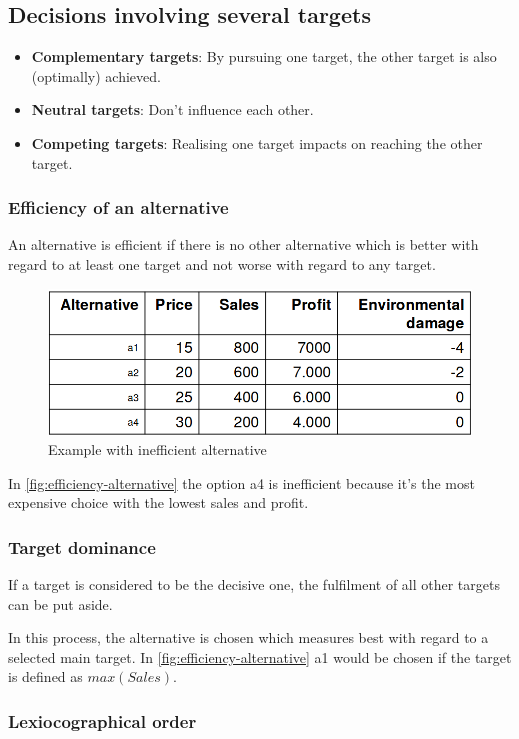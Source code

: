 \subsection{Decisions involving several targets}

\begin{itemize}
\tightlist
\item
  \textbf{Complementary targets}: By pursuing one target, the other
  target is also (optimally) achieved.
\item
  \textbf{Neutral targets}: Don't influence each other.
\item
  \textbf{Competing targets}: Realising one target impacts on reaching
  the other target.
\end{itemize}

\subsubsection{Efficiency of an alternative}
An alternative is efficient if there is no other alternative which is better
with regard to at least one target and not worse with regard to any target.
\begin{figure}[H]
	\centering
	\includegraphics[width=.6\textwidth]{figures/efficiency-alternative.png}
	\caption{Example with inefficient alternative}
	\label{fig:efficiency-alternative}
\end{figure}

In \autoref{fig:efficiency-alternative} the option a4 is inefficient because
it's the most expensive choice with the lowest sales and profit.

\subsubsection{Target dominance}
If a target is considered to be the decisive one, the fulfilment of all other
targets can be put aside.

In this process, the alternative is chosen which measures best with regard
to a selected main target. In \autoref{fig:efficiency-alternative} a1 would
be chosen if the target is defined as $max(Sales)$.

\subsubsection{Lexiocographical order}

